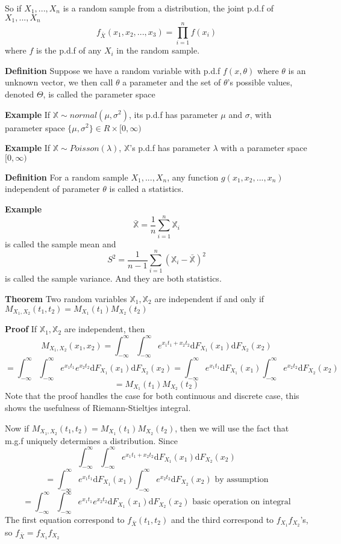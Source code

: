 \documentclass[a4paper,12pt]{article}
\begin{document}
So if $X_1, ..., X_n$ is a random sample from a distribution, the joint p.d.f of $X_1, ..., X_n$
$$f_{\bar{X}}(x_1, x_2, ..., x_3) =  \prod_{i=1}^n f(x_i)$$
where $f$ is the p.d.f of any $X_i$ in the random sample. 
 
\textbf{Definition}
Suppose we have a random variable with p.d.f $f(x, \theta)$ where $\theta$ is an unknown vector, we then call $\theta$ a parameter and the set of $\theta$'s possible values, denoted $\Theta$, is called the parameter space 

\textbf{Example}
If $\mathbb{X} \sim normal(\mu, \sigma^2)$, its p.d.f has parameter $\mu$ and $\sigma$, with parameter space $\{\mu, \sigma^2\} \in R \times
[0, \infty)$

\textbf{Example}
If $\mathbb{X} \sim Poisson(\lambda)$, $\mathbb{X}$'s p.d.f has parameter $\lambda$ with a parameter space $[0, \infty)$ 

\textbf{Definition}
For a random sample $X_1, ..., X_n$, any function $g(x_1, x_2, ..., x_n)$ independent of parameter $\theta$ is called a statistics. 

\textbf{Example}
$$\bar{\mathbb{X}} = \frac{1}{n}\sum_{i=1}^n\mathbb{X}_i$$
is called the sample mean and
$$S^2 = \frac{1}{n-1} \sum_{i=1}^n(\mathbb{X}_i - \bar{\mathbb{X}})^2$$
is called the sample variance. And they are both statistics. 

\textbf{Theorem}
Two random variables $\mathbb{X}_1, \mathbb{X}_2$ are independent if and only if $M_{X_1, X_2}(t_1, t_2) = M_{X_1}(t_1)M_{X_2}(t_2)$ 

\textbf{Proof}
If $\mathbb{X}_1, \mathbb{X}_2$ are independent, then
$$M_{X_1, X_2}(x_1, x_2) = \int_{-\infty}^{\infty}\int_{-\infty}^{\infty} e^{x_1t_1+x_2t_2} \mathrm{d}F_{X_1}(x_1)\mathrm{d}F_{X_2}(x_2)$$
$$ = \int_{-\infty}^{\infty}\int_{-\infty}^{\infty} e^{x_1t_1}e^{x_2t_2} \mathrm{d}F_{X_1}(x_1)\mathrm{d}F_{X_2}(x_2) = \int_{-\infty}^{\infty}e^{x_1t_1}\mathrm{d}F_{X_1}(x_1)\int_{-\infty}^{\infty}e^{x_2t_2}\mathrm{d}F_{X_2}(x_2)$$
$$= M_{X_1}(t_1)M_{X_2}(t_2)$$
Note that the proof handles the case for both continuous and discrete case, this shows the usefulness of Riemann-Stieltjes integral.

Now if $M_{X_1, X_2}(t_1, t_2) = M_{X_1}(t_1)M_{X_2}(t_2)$, then we will use the fact that m.g.f uniquely determines a distribution.
Since
$$\int_{-\infty}^{\infty}\int_{-\infty}^{\infty} e^{x_1t_1+x_2t_2} \mathrm{d}F_{X_1}(x_1)\mathrm{d}F_{X_2}(x_2)$$
$$= \int_{-\infty}^{\infty}e^{x_1t_1}\mathrm{d}F_{X_1}(x_1)\int_{-\infty}^{\infty}e^{x_2t_2}\mathrm{d}F_{X_2}(x_2) \text{ by assumption}$$
$$= \int_{-\infty}^{\infty}\int_{-\infty}^{\infty} e^{x_1t_1}e^{x_2t_2} \mathrm{d}F_{X_1}(x_1)\mathrm{d}F_{X_2}(x_2) \text{ basic operation on integral}$$
The first equation correspond to $f_{\bar{X}}(t_1, t_2)$ and the third correspond to $f_{X_1}f_{X_2}$'s, so $f_{\bar{X}} = f_{X_1}f_{X_2}$ 
\end{document}
